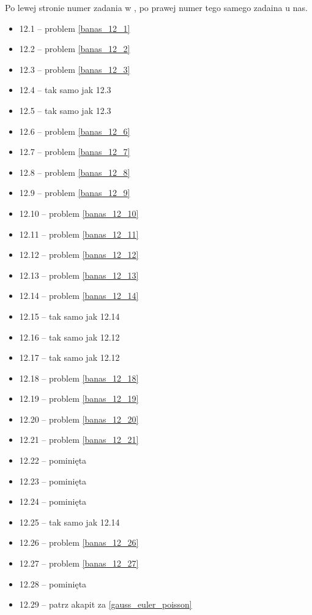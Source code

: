 Po lewej stronie numer zadania w \cite{wedrychowicz12}, po prawej numer tego samego zadaina u nas.

\begin{multicols}{3}
\begin{itemize}
    \item 12.1 -- problem \ref{banas_12_1}
    \item 12.2 -- problem \ref{banas_12_2}
    \item 12.3 -- problem \ref{banas_12_3}
    \item 12.4 -- tak samo jak 12.3
    \item 12.5 -- tak samo jak 12.3
    \item 12.6 -- problem \ref{banas_12_6}
    \item 12.7 -- problem \ref{banas_12_7}
    \item 12.8 -- problem \ref{banas_12_8}
    \item 12.9 -- problem \ref{banas_12_9}
    \item 12.10 -- problem \ref{banas_12_10}
    \item 12.11 -- problem \ref{banas_12_11}
    \item 12.12 -- problem \ref{banas_12_12}
    \item 12.13 -- problem \ref{banas_12_13}
    \item 12.14 -- problem \ref{banas_12_14}
    \item 12.15 -- tak samo jak 12.14
    \item 12.16 -- tak samo jak 12.12
    \item 12.17 -- tak samo jak 12.12
    \item 12.18 -- problem \ref{banas_12_18}
    \item 12.19 -- problem \ref{banas_12_19}
    \item 12.20 -- problem \ref{banas_12_20}
    \item 12.21 -- problem \ref{banas_12_21}
    \item 12.22 -- pominięta
    \item 12.23 -- pominięta
    \item 12.24 -- pominięta
    \item 12.25 -- tak samo jak  12.14
    \item 12.26 -- problem \ref{banas_12_26}
    \item 12.27 -- problem \ref{banas_12_27}
    \item 12.28 -- pominięta
    \item 12.29 -- patrz akapit za \ref{gauss_euler_poisson}

\end{itemize}
\end{multicols}

